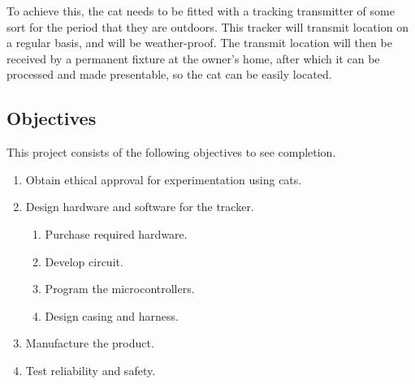 \documentclass[11pt]{article}
\begin{document}
To achieve this, the cat needs to be fitted with a tracking transmitter of some sort for the period that they are outdoors.
This tracker will transmit location on a regular basis, and will be weather-proof. 
The transmit location will then be received by a permanent fixture at the owner's home, 
after which it can be processed and made presentable, so the cat can be easily located. 

\subsection{Objectives}
This project consists of the following objectives to see completion.
\begin{enumerate}
    \item Obtain ethical approval for experimentation using cats.
    \item Design hardware and software for the tracker.
    \begin{enumerate}
        \item Purchase required hardware.
        \item Develop circuit.
        \item Program the microcontrollers.
        \item Design casing and harness.
    \end{enumerate}
    \item Manufacture the product.
    \item Test reliability and safety.
\end{enumerate}
\end{document}
